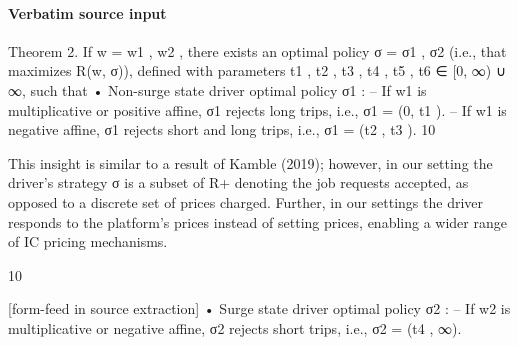 \documentclass[10pt]{article}
\begin{document}
\paragraph{Verbatim source input}
\begin{ReviewVerbatim}
Theorem 2. If w = {w1 , w2 }, there exists an optimal policy σ = {σ1 , σ2 } (i.e., that maximizes
R(w, σ)), defined with parameters t1 , t2 , t3 , t4 , t5 , t6 ∈ [0, ∞) ∪ {∞}, such that
• Non-surge state driver optimal policy σ1 :
– If w1 is multiplicative or positive affine, σ1 rejects long trips, i.e., σ1 = (0, t1 ).
– If w1 is negative affine, σ1 rejects short and long trips, i.e., σ1 = (t2 , t3 ).
10

This insight is similar to a result of Kamble (2019); however, in our setting the driver’s strategy σ is a subset of
R+ denoting the job requests accepted, as opposed to a discrete set of prices charged. Further, in our settings the
driver responds to the platform’s prices instead of setting prices, enabling a wider range of IC pricing mechanisms.

10


[form-feed in source extraction]
• Surge state driver optimal policy σ2 :
– If w2 is multiplicative or negative affine, σ2 rejects short trips, i.e., σ2 = (t4 , ∞).


\end{ReviewVerbatim}
\end{document}
